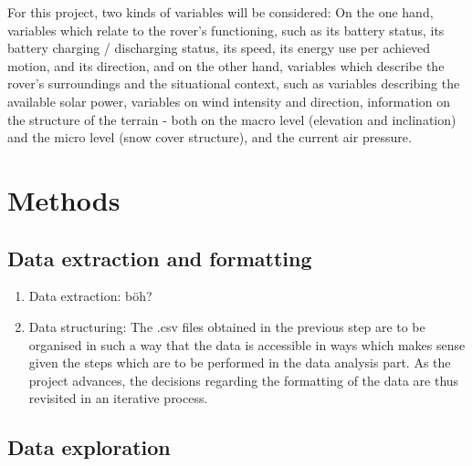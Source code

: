 \documentclass[11pt, UKenglish]{report}
\begin{document}
{For this project, two kinds of variables will be considered: On the one hand, variables which relate to the rover's functioning, such as its battery status, its battery charging / discharging status, its speed, its energy use per achieved motion, and its direction, and on the other hand, variables which describe the rover's surroundings and the situational context, such as variables describing the available solar power, variables on wind intensity and direction, information on the structure of the terrain - both on the macro level (elevation and inclination) and the micro level (snow cover structure), and the current air pressure.


\section*{Methods}

\subsection*{Data extraction and formatting}

\begin{enumerate}

	\item{\large{Data extraction:} \normalsize böh? }	

	\item{\large{Data structuring:} \normalsize  The .csv files obtained in the previous step are to be organised in such a way that the data is accessible in ways which makes sense given the steps which are to be performed in the data analysis part. As the project advances, the decisions regarding the formatting of the data are thus revisited in an iterative process.}

\end{enumerate}

\subsection*{Data exploration}

\begin{enumerate}


\end{enumerate}}
\end{document}
